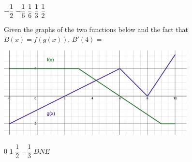 \begin{questions}
    \begin{oneparchoices}
        \choice $-\dfrac{1}{2}$
        \choice $-\dfrac{1}{6}$
        \choice $\dfrac{1}{6}$
        \choice $\dfrac{1}{3}$
        \choice $\dfrac{1}{2}$
    \end{oneparchoices} \par \horizontalline

    \question Given the graphs of the two functions below and the fact that $B(x) = f(g(x))$, $B'(4) =$ 
    \begin{center}
        \includegraphics[width = 0.75\textwidth]{Support/Chapter 1 Graphics/1.7-Graphic10.png}
    \end{center} \vspace{11pt}

    \begin{oneparchoices}
        \choice $0$
        \choice $1$
        \choice $\dfrac{1}{2}$
        \choice $-\dfrac{1}{3}$
        \choice $DNE$
    \end{oneparchoices} \par \horizontalline
\end{questions} 
